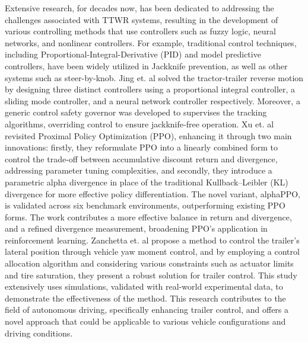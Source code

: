 Extensive research, for decades now, has been dedicated to addressing the challenges associated with TTWR systems, resulting in the development of various controlling methods that use controllers such as fuzzy logic, neural networks, and nonlinear controllers. For example, traditional control techniques, including Proportional-Integral-Derivative (PID) and model predictive controllers, have been widely utilized in Jackknife prevention, as well as other systems such as steer-by-knob. Jing et. al \parencite{jing2019control} solved the tractor-trailer reverse motion by designing three distinct controllers using a proportional integral controller, a sliding mode controller, and a neural network controller respectively. Moreover, a generic control safety governor was developed to supervises the tracking algorithms, overriding control to ensure jackknife-free operation. Xu et. al \parencite{xu2023improving} revisited Proximal Policy Optimization (PPO), enhancing it through two main innovations: firstly, they reformulate PPO into a linearly combined form to control the trade-off between accumulative discount return and divergence, addressing parameter tuning complexities, and secondly, they introduce a parametric alpha divergence in place of the traditional Kullback–Leibler (KL) divergence for more effective policy differentiation. The novel variant, alphaPPO, is validated across six benchmark environments, outperforming existing PPO forms. The work contributes a more effective balance in return and divergence, and a refined divergence measurement, broadening PPO's application in reinforcement learning. Zanchetta et. al \parencite{zanchetta2019trailer} propose a method to control the trailer's lateral position through vehicle yaw moment control, and by employing a control allocation algorithm and considering various constraints such as actuator limits and tire saturation, they present a robust solution for trailer control. This study extensively uses simulations, validated with real-world experimental data, to demonstrate the effectiveness of the method. This research contributes to the field of autonomous driving, specifically enhancing trailer control, and offers a novel approach that could be applicable to various vehicle configurations and driving conditions.

